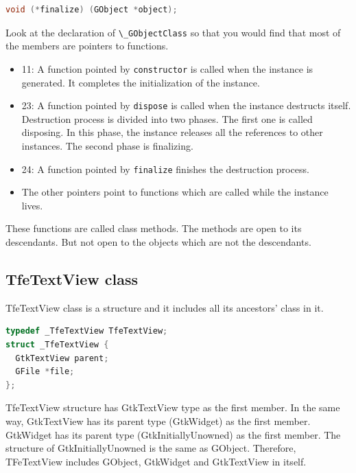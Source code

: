 \begin{lstlisting}[language=C]
void (*finalize) (GObject *object);
\end{lstlisting}

Look at the declaration of \passthrough{\lstinline!\_GObjectClass!} so
that you would find that most of the members are pointers to functions.

\begin{itemize}
\tightlist
\item
  11: A function pointed by \passthrough{\lstinline!constructor!} is
  called when the instance is generated. It completes the initialization
  of the instance.
\item
  23: A function pointed by \passthrough{\lstinline!dispose!} is called
  when the instance destructs itself. Destruction process is divided
  into two phases. The first one is called disposing. In this phase, the
  instance releases all the references to other instances. The second
  phase is finalizing.
\item
  24: A function pointed by \passthrough{\lstinline!finalize!} finishes
  the destruction process.
\item
  The other pointers point to functions which are called while the
  instance lives.
\end{itemize}

These functions are called class methods. The methods are open to its
descendants. But not open to the objects which are not the descendants.

\hypertarget{tfetextview-class}{%
\subsection{TfeTextView class}\label{tfetextview-class}}

TfeTextView class is a structure and it includes all its ancestors'
class in it.

\begin{lstlisting}[language=C]
typedef _TfeTextView TfeTextView;
struct _TfeTextView {
  GtkTextView parent;
  GFile *file;
};
\end{lstlisting}

TfeTextView structure has GtkTextView type as the first member. In the
same way, GtkTextView has its parent type (GtkWidget) as the first
member. GtkWidget has its parent type (GtkInitiallyUnowned) as the first
member. The structure of GtkInitiallyUnowned is the same as GObject.
Therefore, TFeTextView includes GObject, GtkWidget and GtkTextView in
itself.

